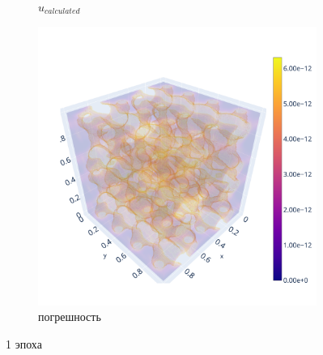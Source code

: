 \documentclass[a4paper,hidelinks,12pt]{article}
\begin{document}
\begin{figure}[H]
\begin{subfigure}{.33\textwidth}
  \caption{$u_{calculated}$}
\end{subfigure}%
\begin{subfigure}{.33\textwidth}
  \centering
  \includegraphics[width=\linewidth]{pictures/1_L1_128_diff.png}
  \caption{погрешность}
\end{subfigure}%
\caption{1 эпоха}
\label{fig:fig}
\end{figure}
\end{document}
